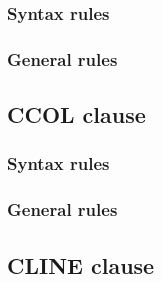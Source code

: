 \subsubsection{Syntax rules}

\subsubsection{General rules}

\subsection{CCOL clause}

\begin{syntax}[\miscextcolour]
\end{syntax}

\subsubsection{Syntax rules}

\subsubsection{General rules}

\subsection{CLINE clause}

\begin{syntax}[\miscextcolour]
\end{syntax}

